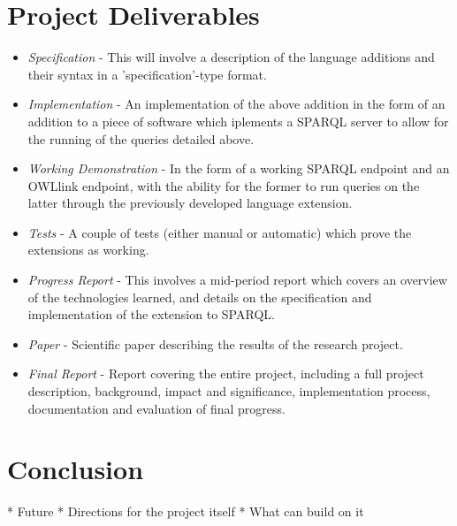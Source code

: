 \documentclass{article}
\begin{document}
\section{Project Deliverables}

\begin{itemize}
  \item \emph{Specification} - This will involve a description of the language additions 
  and their syntax in a 'specification'-type format. 
  \item \emph{Implementation} - An implementation of the above addition in the
  form of an addition to a piece of software which iplements a SPARQL server to
  allow for the running of the queries detailed above.
  \item \emph{Working Demonstration} - In the form of a working SPARQL endpoint
  and an OWLlink endpoint, with the ability for the former to run queries on the
  latter through the previously developed language extension.
  \item \emph{Tests} - A couple of tests (either manual or automatic) which
  prove the extensions as working.
  \item \emph{Progress Report} - This involves a mid-period report which covers
  an overview of the technologies learned, and details on the specification and 
  implementation of the extension to SPARQL.
  \item \emph{Paper} - Scientific paper describing the results of the research
  project.
  \item \emph{Final Report} - Report covering the entire project, including
  a full project description, background, impact and significance, 
  implementation process, documentation and evaluation of final progress.
\end{itemize}

\section{Conclusion}

* Future
* Directions for the project itself
* What can build on it
\end{document}
